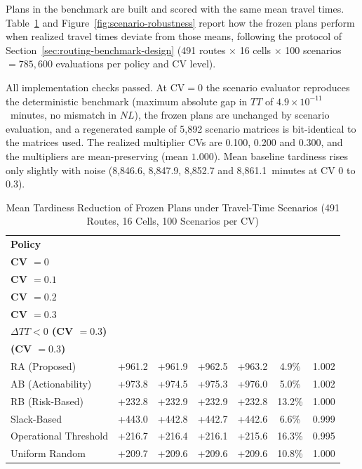 \documentclass[11pt,a4paper]{article}
\begin{document}
Plans in the benchmark are built and scored with the same mean travel times. Table~\ref{tab:scenario-robustness} and Figure~\ref{fig:scenario-robustness} report how the frozen plans perform when realized travel times deviate from those means, following the protocol of Section~\ref{sec:routing-benchmark-design} (491 routes $\times$ 16 cells $\times$ 100 scenarios $= 785{,}600$ evaluations per policy and CV level).

All implementation checks passed. At $\mathrm{CV}=0$ the scenario evaluator reproduces the deterministic benchmark (maximum absolute gap in $TT$ of $4.9 \times 10^{-11}$~minutes, no mismatch in $NL$), the frozen plans are unchanged by scenario evaluation, and a regenerated sample of 5,892 scenario matrices is bit-identical to the matrices used. The realized multiplier CVs are 0.100, 0.200 and 0.300, and the multipliers are mean-preserving (mean $1.000$). Mean baseline tardiness rises only slightly with noise (8,846.6, 8,847.9, 8,852.7 and 8,861.1~minutes at CV 0 to 0.3).

\begin{table}[htbp]
\centering
\caption{Mean Tardiness Reduction of Frozen Plans under Travel-Time Scenarios (491 Routes, 16 Cells, 100 Scenarios per CV)}
\label{tab:scenario-robustness}
\scriptsize
\setlength{\tabcolsep}{3pt}
\renewcommand{\arraystretch}{1.15}
\begin{tabular}{lcccccc}
\toprule
\textbf{Policy} & \shortstack{\textbf{$\Delta TT$}\\\textbf{CV $=0$}} & \shortstack{\textbf{$\Delta TT$}\\\textbf{CV $=0.1$}} & \shortstack{\textbf{$\Delta TT$}\\\textbf{CV $=0.2$}} & \shortstack{\textbf{$\Delta TT$}\\\textbf{CV $=0.3$}} & \shortstack{\textbf{Scenarios with}\\\textbf{$\Delta TT<0$ (CV $=0.3$)}} & \shortstack{\textbf{Retention}\\\textbf{(CV $=0.3$)}} \\
\midrule
RA (Proposed) & +961.2 & +961.9 & +962.5 & +963.2 & 4.9\% & 1.002 \\
AB (Actionability) & +973.8 & +974.5 & +975.3 & +976.0 & 5.0\% & 1.002 \\
RB (Risk-Based) & +232.8 & +232.9 & +232.9 & +232.8 & 13.2\% & 1.000 \\
Slack-Based & +443.0 & +442.8 & +442.7 & +442.6 & 6.6\% & 0.999 \\
Operational Threshold & +216.7 & +216.4 & +216.1 & +215.6 & 16.3\% & 0.995 \\
Uniform Random & +209.7 & +209.6 & +209.6 & +209.6 & 10.8\% & 1.000 \\
\bottomrule
\end{tabular}
\end{table}
\end{document}

